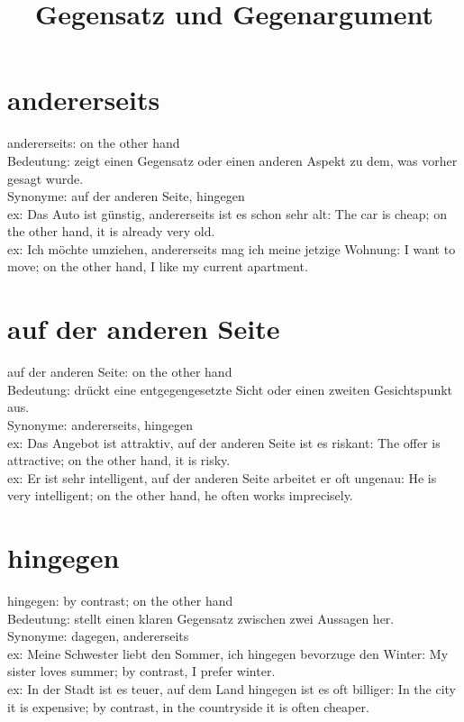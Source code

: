 \documentclass[a4paper]{article}
\title{Gegensatz und Gegenargument}
\date{}
\begin{document}
    \maketitle
    
    
    \section{andererseits}
        andererseits: on the other hand \\
        Bedeutung: zeigt einen Gegensatz oder einen anderen Aspekt zu dem, was vorher gesagt wurde. \\
        Synonyme: auf der anderen Seite, hingegen \\
        ex: Das Auto ist günstig, andererseits ist es schon sehr alt: The car is cheap; on the other hand, it is already very old. \\
        ex: Ich möchte umziehen, andererseits mag ich meine jetzige Wohnung: I want to move; on the other hand, I like my current apartment. \\
    
    
    \section{auf der anderen Seite}
        auf der anderen Seite: on the other hand \\
        Bedeutung: drückt eine entgegengesetzte Sicht oder einen zweiten Gesichtspunkt aus. \\
        Synonyme: andererseits, hingegen \\
        ex: Das Angebot ist attraktiv, auf der anderen Seite ist es riskant: The offer is attractive; on the other hand, it is risky. \\
        ex: Er ist sehr intelligent, auf der anderen Seite arbeitet er oft ungenau: He is very intelligent; on the other hand, he often works imprecisely. \\
    
    
    \section{hingegen}
        hingegen: by contrast; on the other hand \\
        Bedeutung: stellt einen klaren Gegensatz zwischen zwei Aussagen her. \\
        Synonyme: dagegen, andererseits \\
        ex: Meine Schwester liebt den Sommer, ich hingegen bevorzuge den Winter: My sister loves summer; by contrast, I prefer winter. \\
        ex: In der Stadt ist es teuer, auf dem Land hingegen ist es oft billiger: In the city it is expensive; by contrast, in the countryside it is often cheaper. \\
    
\end{document}
